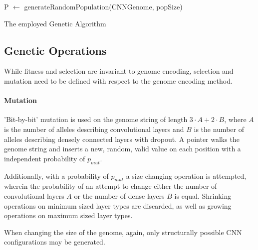 \documentclass[11pt,a4paper,twoside,openright]{scrbook}
\begin{document}
\medskip
\begin{algorithm}[H]\label{alg:GA}
\SetAlgoLined
{}

P \(\leftarrow\) generateRandomPopulation(CNNGenome, popSize)\;
\caption{The employed Genetic Algorithm}
\end{algorithm}

\subsection{Genetic Operations}
While fitness and selection are invariant to genome encoding, selection and mutation need to be defined with respect to the genome encoding method.

\paragraph{Mutation}
'Bit-by-bit' mutation is used on the genome string of length \(3 \cdot A + 2 \cdot B\), where \(A\) is the number of alleles describing convolutional layers and \(B\) is the number of alleles describing densely connected layers with dropout. A pointer walks the genome string and inserts a new, random, valid value on each position with a independent probability of \(p_{mut}\).

Additionally, with a probability of \(p_{mut}\) a size changing operation is attempted, wherein the probability of an attempt to change either the number of convolutional layers \(A\) or the number of dense layers \(B\) is equal. Shrinking operations on minimum sized layer types are discarded, as well as growing operations on maximum sized layer types.

When changing the size of the genome, again, only structurally possible CNN configurations may be generated.
\end{document}
